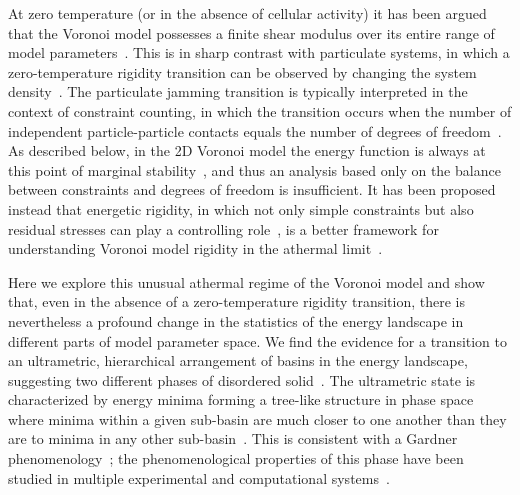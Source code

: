 \documentclass[reprint,amsmath,amssymb,aps]{revtex4-2}
\begin{document}
At zero temperature (or in the absence of cellular activity) it has been argued that the Voronoi model possesses a finite shear modulus over its entire range of model parameters~\cite{Sussman2018}. This is in sharp contrast with particulate systems, in which a zero-temperature rigidity transition can be observed by changing the system density~\cite{Parisi2010, Goodrich2012, Charbonneau2017, Baule2018}. The particulate jamming transition is typically interpreted in the context of constraint counting, in which the transition occurs when the number of independent particle-particle contacts equals the number of degrees of freedom~\cite{Lubensky2015,franz2019critical}. As described below, in the 2D Voronoi model the energy function is always at this point of marginal stability~\cite{Sussman2018}, and thus an analysis based only on the balance between constraints and degrees of freedom is insufficient. It has been proposed instead that energetic rigidity, in which not only simple constraints but also residual stresses can play a controlling role~\cite{Merkel2018, Merkel2019,Yan2019, Damavandi2021}, is a better framework for understanding Voronoi model rigidity in the athermal limit~\cite{Damavandi2021}.

Here we explore this unusual athermal regime of the Voronoi model and show that, even in the absence of a zero-temperature rigidity transition, there is nevertheless a profound change in the statistics of the energy landscape in different parts of model parameter space. We find the evidence for a transition to an ultrametric, hierarchical arrangement of basins in the energy landscape, suggesting two different phases of disordered solid~\cite{Charbonneau2015, Liao2019, Artiaco2020, Dennis2020}. The ultrametric state is characterized by energy minima forming a tree-like structure in phase space where minima within a given sub-basin are much closer to one another than they are to minima in any other sub-basin~\cite{Parisi2010, Charbonneau2017}. This is consistent with a Gardner phenomenology~\cite{Parisi2010, Charbonneau2017}; the phenomenological properties of this phase have been studied in multiple experimental and computational systems~\cite{Charbonneau2015,seguin2016experimental,scalliet2017absence,Liao2019, Artiaco2020, Dennis2020}.
\end{document}
